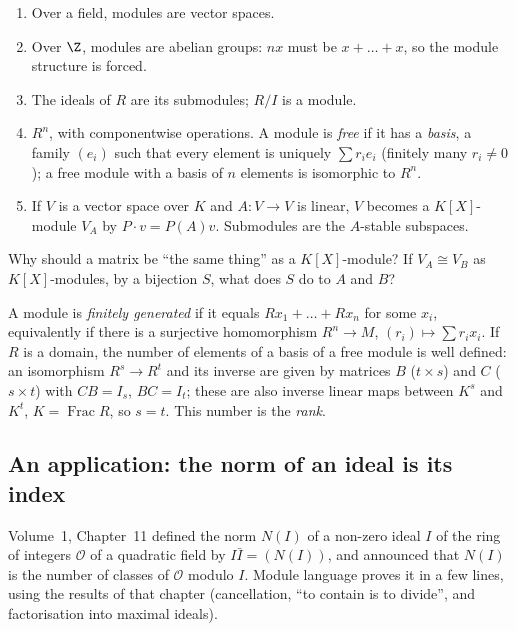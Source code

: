 \begin{example}\label{ex:modules}
\begin{enumerate}[label=(\arabic*)]
\item Over a field, modules are vector spaces.
\item Over $\Z$, modules are abelian groups: $nx$ must be $x+\dots+x$, so the module structure is forced.
\item The ideals of $R$ are its submodules; $R/I$ is a module.
\item $R^n$, with componentwise operations. A module is \emph{free} if it has a \emph{basis}, a family $(e_i)$ such that every element is uniquely $\sum r_ie_i$ (finitely many $r_i\ne0$); a free module with a basis of $n$ elements is isomorphic to $R^n$.
\item If $V$ is a vector space over $K$ and $A:V\to V$ is linear, $V$ becomes a $K[X]$-module $V_A$ by $P\cdot v=P(A)v$. Submodules are the $A$-stable subspaces.
\end{enumerate}
\end{example}

\begin{think}
Why should a matrix be ``the same thing'' as a $K[X]$-module? If $V_A\cong V_B$ as $K[X]$-modules, by a bijection $S$, what does $S$ do to $A$ and $B$?
\end{think}

A module is \emph{finitely generated} if it equals $Rx_1+\dots+Rx_n$ for some $x_i$, equivalently if there is a surjective homomorphism $R^n\to M$, $(r_i)\mapsto\sum r_ix_i$. If $R$ is a domain, the number of elements of a basis of a free module is well defined: an isomorphism $R^s\to R^t$ and its inverse are given by matrices $B$ ($t\times s$) and $C$ ($s\times t$) with $CB=I_s$, $BC=I_t$; these are also inverse linear maps between $K^s$ and $K^t$, $K=\operatorname{Frac}R$, so $s=t$. This number is the \emph{rank}.

\subsection*{An application: the norm of an ideal is its index}

Volume~1, Chapter~11 defined the norm $N(I)$ of a non-zero ideal $I$ of the ring of integers $\mathcal O$ of a quadratic field by $I\bar I=(N(I))$, and announced that $N(I)$ is the number of classes of $\mathcal O$ modulo $I$. Module language proves it in a few lines, using the results of that chapter (cancellation, ``to contain is to divide'', and factorisation into maximal ideals).


